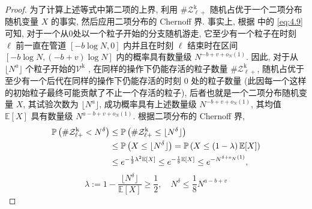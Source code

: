 \begin{proof}
{    }{
        为了计算上述等式中第二项的上界, 利用 $\#\mathcal Z^{\mathrm{k}}_{\ell+}$ 随机占优于一个二项分布随机变量 $X$ 的事实, 然后应用二项分布的 Chernoff 界. 事实上, 根据 中的 \eqref{eq:4.9} 可知, 对于一个从$0$处以一个粒子开始的分支随机游走, 它至少有一个粒子在时刻 $\ell$ 前一直在管道 $[-b\log N,0]$ 内并且在时刻 $\ell$ 结束时在区间 $[-b\log N, (-b+v)\log N]$ 内的概率具有数量级 $N^{-b+v+o_N(1)}$. 因此, 对于从 $\lfloor N^a\rfloor$ 个粒子开始的$\mathcal V^{\mathrm{k}}$ , 在同样的操作下仍能存活的粒子数量 $\#\mathcal Z^{\mathrm{k}}_{\ell+}$, 随机占优于至少有一个后代在同样的操作下仍能存活的时刻 $0$ 处的粒子数量 (此因每一个这样的初始粒子最终可能贡献了不止一个存活的粒子), 后者也就是一个二项分布随机变量 $X$, 其试验次数为 $\lfloor N^a\rfloor$, 成功概率具有上述数量级 $N^{-b+v+o_N(1)}$, 其均值 $\mathbb E[X]$ 具有数量级 $N^{a-b+v+o_N(1)}$. 根据二项分布的 Chernoff 界,
    }
    \begin{align*}
        \mathbb P\left(
            \#\mathcal Z^{\mathrm{k}}_{\ell+}
            <
            N^\delta
        \right)
        &
        \le
        \mathbb P\left(
            \#\mathcal Z^{\mathrm{k}}_{\ell+}
            \le
            \lfloor N^\delta\rfloor
        \right)
        \\ &
        \le
        \mathbb P\left(
            X
            \le
            \lfloor N^\delta\rfloor
        \right)
        =
        \mathbb P\left(
            X
            \le
            \left(
                1
                -
                \lambda
            \right)
            \mathbb E[X]
        \right)
        \\ &
        \le
        e^{
            -\frac 12
            \lambda^2
            \mathbb E[X]
        }
        \le
        e^{
            -\frac 18
            \mathbb E[X]
        }
        \le
        e^{
            -N^{
                \delta+
                o_{\text{\fontsize{5pt}{5pt}$N$}}{\text{\fontsize{6pt}{5pt}$(1)$}}
            }
        },
    \end{align*}
    \begin{equation*}
        \lambda
        :=
        1
        -
        \frac{
            \lfloor N^\delta\rfloor
        }{
            \mathbb E[X]
        }
        \ge
        \frac 12,
        \quad
        N^\delta
        \le
        \frac 18
        N^{a-b+v}
    \end{equation*}
\end{proof}
